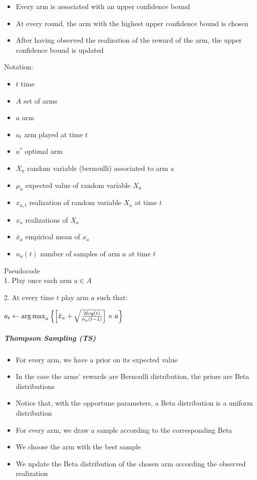 \begin{itemize}
	\item Every arm is associated with an upper confidence bound 
	\item At every round, the arm with the highest upper confidence bound is chosen
	\item After having observed the realization of the reward of the arm, the upper confidence bound is updated
\end{itemize}
Notation:\\
\begin{itemize}
\item $t$ time
\item $A$ set of arms
\item $a$ arm
\item $a_{t}$ arm played at time $t$
\item $a^*$ optimal arm
\item $X_{a}$ random variable (bernoulli) associated to arm a
\item $\mu_{a}$ expected value of random variable $X_{a}$
\item $x_{a,t}$ realization of random variable $X_{a}$ at time $t$
\item $x_{a}$ realizations of $X_{a}$
\item $\bar{x}_{a}$ empirical mean of $x_{a}$
\item $n_{a}(t)$ number of samples of arm $a$ at time $t$
\end{itemize}

Pseudocode\\

1. Play once each arm $a \in A$

2. At every time $t$ play arm $a$ such that:

$a_{t} \leftarrow \operatorname{arg\,max}_a{\left\{\left[\bar{x}_{a} + \sqrt{\frac{2 log(t)}{{n_{a}(t-1)}} }\right]\times a\right\}}$

\subparagraph*{Thompson Sampling (TS)}

\begin{itemize}
	\item For every arm, we have a prior on its expected value 
	\item In the case the arms’ rewards are Bernoulli distribution, the priors are Beta distributions
	\item Notice that, with the opportune parameters, a Beta distribution is a uniform distribution 
	\item For every arm, we draw a sample according to the corresponding Beta
	\item We choose the arm with the best sample 
	\item We update the Beta distribution of the chosen arm according the observed realization
\end{itemize}

